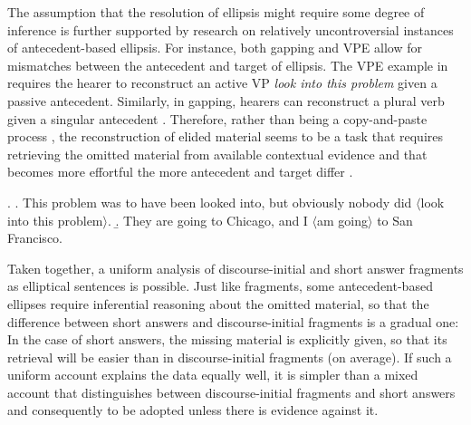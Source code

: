 The assumption that the resolution of ellipsis might require some degree of inference is further supported by research on relatively uncontroversial instances of antecedent-based ellipsis. For instance, both gapping and VPE allow for mismatches between the antecedent and target of ellipsis. The VPE example in \Next[a] requires the hearer to reconstruct an active VP \textit{look into this problem} given a passive antecedent. Similarly, in gapping, hearers can reconstruct a plural verb given a singular antecedent \Next[b]. Therefore, rather than being a copy-and-paste process \citep{frazier.clifton2001}, the reconstruction of elided material seems to be a task that requires retrieving the omitted material from available contextual evidence and that becomes more effortful the more antecedent and target differ \citep{arregui.etal2006}.

\ex. \a. This problem was to have been looked into, but obviously nobody did $\langle$look into this problem$\rangle$.\hfill \citep[548]{kehler2002}
     \b. They are going to Chicago, and I $\langle$am going$\rangle$ to San Francisco.\\ \mbox{}\hfill \citep[755]{pullum.zwicky1986}

Taken together, a uniform analysis of discourse-initial and short answer fragments as elliptical sentences is possible. Just like fragments, some antecedent-based ellipses require inferential reasoning about the omitted material, so that the difference between short answers and dis\-course-initial fragments is a gradual one: In the case of short answers, the missing material is explicitly given, so that its retrieval will be easier than in discourse-initial fragments (on average). If such a uniform account explains the data equally well, it is simpler than a mixed account that distinguishes between discourse-initial fragments and short answers and consequently to be adopted unless there is evidence against it.

